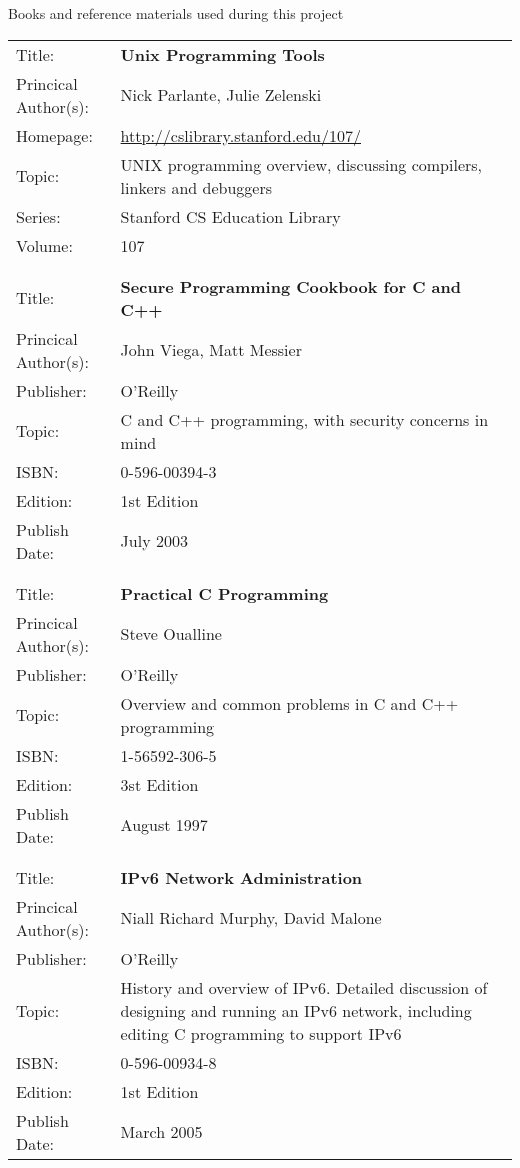 \documentclass[a4paper,12pt]{article}
\begin{document}
Books and reference materials used during this project

\begin{tabular}{ll}
Title: &	\textbf{Unix Programming Tools}	\\
Princical Author(s): &	Nick Parlante, Julie Zelenski \\
Homepage: &	\url{http://cslibrary.stanford.edu/107/}	\\	
Topic:	&	UNIX programming overview, discussing compilers, linkers and debuggers \\
Series:	&	Stanford CS Education Library	\\
Volume:	&	107 \\

	&	\\
	&	\\

Title: &	\textbf{Secure Programming Cookbook for C and C++}	\\
Princical Author(s): &	John Viega, Matt Messier  \\
Publisher:&	O'Reilly	\\	
Topic:	&	C and C++ programming, with security concerns in mind \\
ISBN:		&	0-596-00394-3 \\
Edition:	&	1st Edition \\
Publish Date:	&	July 2003 \\

	&	\\
	&	\\
	
Title: &	\textbf{Practical C Programming}	\\
Princical Author(s): &	Steve Oualline  \\
Publisher:&	O'Reilly	\\	
Topic:	&	Overview and common problems in C and C++ programming \\
ISBN:		&	1-56592-306-5 \\
Edition:	&	3st Edition \\
Publish Date:	&	August 1997 \\

	&	\\
	&	\\

Title: &	\textbf{IPv6 Network Administration}	\\
Princical Author(s): &	Niall Richard Murphy, David Malone  \\
Publisher:&	O'Reilly	\\	
Topic:	&	History and overview of IPv6. Detailed discussion of
designing and running an IPv6 network, including editing C programming
to support IPv6 \\
ISBN:		&	0-596-00934-8 \\
Edition:	&	1st Edition \\
Publish Date:	&	March 2005 \\


\end{tabular}
\end{document}
